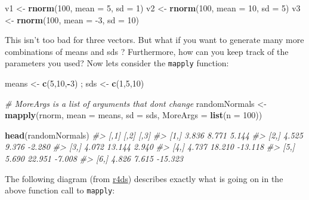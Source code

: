 \documentclass[]{book}
\makeatletter
\newenvironment{Shaded}{\begin{snugshade}}{\end{snugshade}}
\newcommand{\KeywordTok}[1]{\textcolor[rgb]{0.13,0.29,0.53}{\textbf{#1}}}
\newcommand{\DataTypeTok}[1]{\textcolor[rgb]{0.13,0.29,0.53}{#1}}
\newcommand{\DecValTok}[1]{\textcolor[rgb]{0.00,0.00,0.81}{#1}}
\newcommand{\StringTok}[1]{\textcolor[rgb]{0.31,0.60,0.02}{#1}}
\newcommand{\CommentTok}[1]{\textcolor[rgb]{0.56,0.35,0.01}{\textit{#1}}}
\newcommand{\OperatorTok}[1]{\textcolor[rgb]{0.81,0.36,0.00}{\textbf{#1}}}
\newcommand{\NormalTok}[1]{#1}
\newenvironment{kframe}{%
\medskip{}
\setlength{\fboxsep}{.8em}
 \def\at@end@of@kframe{}%
 \ifinner\ifhmode%
  \def\at@end@of@kframe{\end{minipage}}%
  \begin{minipage}{\columnwidth}%
 \fi\fi%
 \def\FrameCommand##1{\hskip\@totalleftmargin \hskip-\fboxsep
 \colorbox{shadecolor}{##1}\hskip-\fboxsep
     \hskip-\linewidth \hskip-\@totalleftmargin \hskip\columnwidth}%
 \MakeFramed {\advance\hsize-\width
   \@totalleftmargin\z@ \linewidth\hsize
   \@setminipage}}%
 {\par\unskip\endMakeFramed%
 \at@end@of@kframe}
\renewenvironment{Shaded}{\begin{kframe}}{\end{kframe}}
\makeatother
\begin{document}
\begin{Shaded}
\begin{Highlighting}[]
\NormalTok{v1 <-}\StringTok{ }\KeywordTok{rnorm}\NormalTok{(}\DecValTok{100}\NormalTok{, }\DataTypeTok{mean =} \DecValTok{5}\NormalTok{, }\DataTypeTok{sd =} \DecValTok{1}\NormalTok{)}
\NormalTok{v2 <-}\StringTok{ }\KeywordTok{rnorm}\NormalTok{(}\DecValTok{100}\NormalTok{, }\DataTypeTok{mean =} \DecValTok{10}\NormalTok{, }\DataTypeTok{sd =} \DecValTok{5}\NormalTok{)}
\NormalTok{v3 <-}\StringTok{ }\KeywordTok{rnorm}\NormalTok{(}\DecValTok{100}\NormalTok{, }\DataTypeTok{mean =} \DecValTok{-3}\NormalTok{, }\DataTypeTok{sd =} \DecValTok{10}\NormalTok{)}
\end{Highlighting}
\end{Shaded}

This isn't too bad for three vectors. But what if you want to generate
many more combinations of means and sds ? Furthermore, how can you keep
track of the parameters you used? Now lets consider the \texttt{mapply}
function:

\begin{Shaded}
\begin{Highlighting}[]
\NormalTok{means <-}\StringTok{ }\KeywordTok{c}\NormalTok{(}\DecValTok{5}\NormalTok{,}\DecValTok{10}\NormalTok{,}\OperatorTok{-}\DecValTok{3}\NormalTok{) ; sds <-}\StringTok{ }\KeywordTok{c}\NormalTok{(}\DecValTok{1}\NormalTok{,}\DecValTok{5}\NormalTok{,}\DecValTok{10}\NormalTok{) }

\CommentTok{# MoreArgs is a list of arguments that dont change}
\NormalTok{randomNormals <-}\StringTok{ }\KeywordTok{mapply}\NormalTok{(rnorm, }\DataTypeTok{mean =}\NormalTok{ means, }\DataTypeTok{sd =}\NormalTok{ sds, }
                        \DataTypeTok{MoreArgs =} \KeywordTok{list}\NormalTok{(}\DataTypeTok{n =} \DecValTok{100}\NormalTok{))}

\KeywordTok{head}\NormalTok{(randomNormals)}
\CommentTok{#>       [,1]   [,2]    [,3]}
\CommentTok{#> [1,] 3.836  8.771   5.144}
\CommentTok{#> [2,] 4.525  9.376  -2.280}
\CommentTok{#> [3,] 4.072 13.144   2.940}
\CommentTok{#> [4,] 4.737 18.210 -13.118}
\CommentTok{#> [5,] 5.690 22.951  -7.008}
\CommentTok{#> [6,] 4.826  7.615 -15.323}
\end{Highlighting}
\end{Shaded}

The following diagram (from
\href{http://r4ds.had.co.nz/iteration.html\#mapping-over-multiple-arguments}{r4ds})
describes exactly what is going on in the above function call to
\texttt{mapply}:
\end{document}

